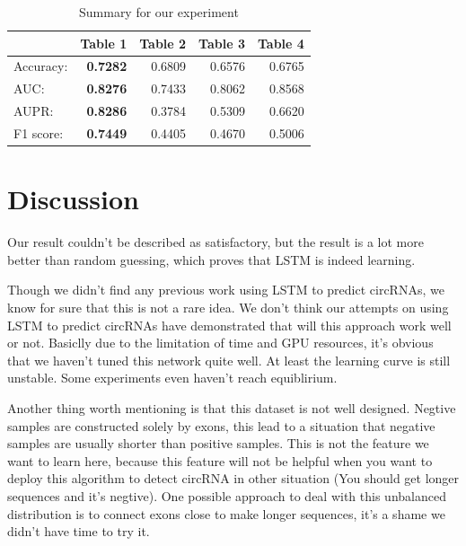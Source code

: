 \documentclass[10pt,a4paper]{article}
\begin{document}
\begin{spacing}{1.5}
		\begin{table}[H]
			\centering
			\caption{Summary for our experiment}
			\begin{tabular}{l|r|r|r|r}
				& \multicolumn{1}{l}{Table 1} & \multicolumn{1}{l}{Table 2} & \multicolumn{1}{l}{Table 3} & \multicolumn{1}{l}{Table 4} \\ \hline \hline
				Accuracy: & \textbf{0.7282}  & 0.6809  & 0.6576  & 0.6765  \\
				AUC:  & \textbf{0.8276}  & 0.7433  & 0.8062  & 0.8568  \\
				AUPR: & \textbf{0.8286}  & 0.3784  & 0.5309  & 0.6620  \\
				F1 score: & \textbf{0.7449}  & 0.4405  & 0.4670  & 0.5006  \\
			\end{tabular}%
			\label{tab:addlabel}%
		\end{table}%
		
		\section{Discussion}
		
		Our result couldn't be described as satisfactory, but the result is a lot more better than random guessing, which proves that LSTM is indeed learning.
		
		Though we didn't find any previous work using LSTM to predict circRNAs, we know for sure that this is not a rare idea. We don't think our attempts on using LSTM to predict circRNAs have demonstrated that will this approach work well or not. Basiclly due to the limitation of time and GPU resources, it's obvious that we haven't tuned this network quite well. At least the learning curve is still unstable. Some experiments even haven't reach equiblirium.
		
		Another thing worth mentioning is that this dataset is not well designed. Negtive samples are constructed solely by exons, this lead to a situation that negative samples are usually shorter than positive samples. This is not the feature we want to learn here, because this feature will not be helpful when you want to deploy this algorithm to detect circRNA in other situation (You should get longer sequences and it's negtive). One possible approach to deal with this unbalanced distribution is to connect exons close to make longer sequences, it's a shame we didn't have time to try it.
		

\end{spacing}
\end{document}
